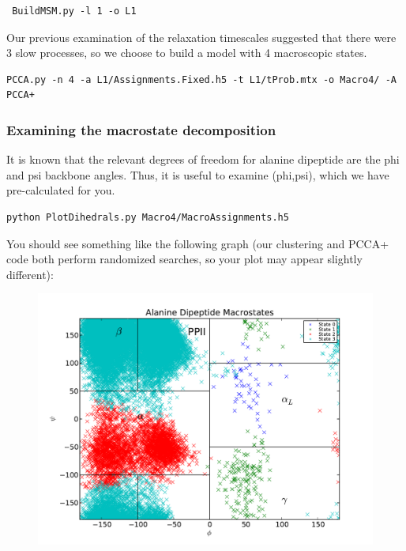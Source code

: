 \documentclass[12pt]{article}
\begin{document}
\begin{verbatim}
 BuildMSM.py -l 1 -o L1
\end{verbatim}

Our previous examination of the relaxation timescales suggested that there were 3 slow processes, so we choose to build a model with 4 macroscopic states.  

\begin{verbatim}
PCCA.py -n 4 -a L1/Assignments.Fixed.h5 -t L1/tProb.mtx -o Macro4/ -A PCCA+
\end{verbatim}

\subsubsection{Examining the macrostate decomposition}

It is known that the relevant degrees of freedom for alanine dipeptide are the phi and psi backbone angles.  Thus, it is useful to examine (phi,psi), which we have pre-calculated for you.

\begin{verbatim}
python PlotDihedrals.py Macro4/MacroAssignments.h5
\end{verbatim}

You should see something like the following graph (our clustering and PCCA+ code both perform randomized searches, so your plot may appear slightly different):
\begin{figure}
\begin{center}
\includegraphics[width=11.7cm]{figures/Macro4}
\end{center}
\end{figure}
\end{document}
